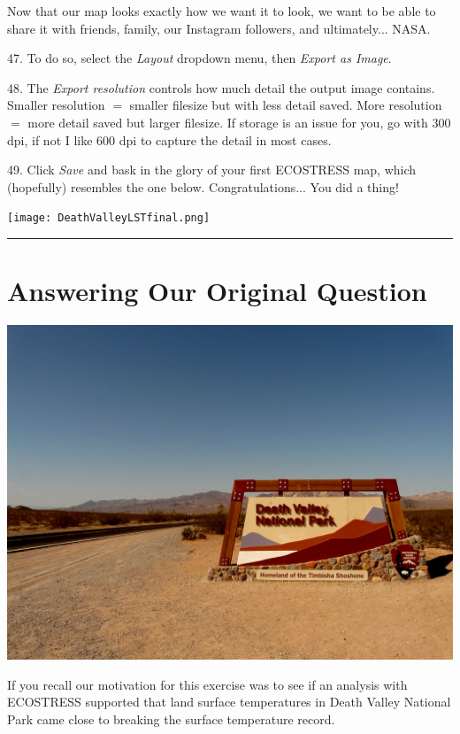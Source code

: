\documentclass[oneside,a4paper,11pt,explicit]{book}
\begin{document}
Now that our map looks exactly how we want it to look, we want to be able to share it with friends, family, our Instagram followers, and ultimately... NASA. 

47. To do so, select the \textit{Layout} dropdown menu, then \textit{Export as Image}. 

48. The \textit{Export resolution} controls how much detail the output image contains. Smaller resolution $=$ smaller filesize but with less detail saved. More resolution $=$ more detail saved but larger filesize. If storage is an issue for you, go with 300 dpi, if not I like 600 dpi to capture the detail in most cases.

49. Click \textit{Save} and bask in the glory of your first ECOSTRESS map, which (hopefully) resembles the one below. Congratulations... You did a thing!


\centerline{\texttt{[image: DeathValleyLSTfinal.png]}}

\vspace{.25em}

\hrule

\section{Answering Our Original Question}

\centerline{\includegraphics[width=.75\textwidth]{DeathValleySign.jpg}}

If you recall our motivation for this exercise was to see if an analysis with ECOSTRESS supported that land surface temperatures in Death Valley National Park came close to breaking the surface temperature record. 
\end{document}
